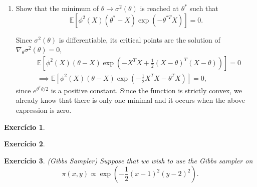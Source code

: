 \documentclass[a4paper,12pt]{article}
\newcommand{\ev}{\mathbb{E}}
\newtheorem{exercise}{Exercício}
\theoremstyle{definition}
\begin{document}
\begin{enumerate}
    \item Show that the minimum of $\theta \to \sigma^2(\theta)$ is 
    reached at $\theta^{*}$ such that
    $$
    \ev[\phi^2(X)(\theta^* - X)\exp(-\theta^{*T}X)] = 0.
    $$

    Since $\sigma^2(\theta)$ is differentiable, its critical points are 
    the solution of $\nabla_\theta \sigma^2(\theta) = 0$, 
    \begin{equation*}
        \begin{split}
            &\ev\left[\phi^2(X)(\theta-X)\exp\left(-X^TX +
        \frac{1}{2}(X-\theta)^T(X-\theta)\right)\right] = 0 \\
        &\implies \ev\left[\phi^2(X)(\theta-X)\exp\left(-\frac{1}{2}X^TX
        -\theta^TX\right)\right] = 0, 
        \end{split}
    \end{equation*}  
    since $e^{\theta^T\theta/2}$ is a positive constant. Since the function 
    is strictly convex, we already know that there is only one minimal 
    and it occurs when the above expression is zero. 
\end{enumerate}

\begin{exercise}
    
\end{exercise}

\begin{exercise}
    
\end{exercise}

\begin{exercise}
    (Gibbs Sampler) 
    Suppose that we wish to use the Gibbs sampler on
    $$
    \pi(x,y) \propto \exp\left(-\frac{1}{2}(x-1)^2(y-2)^2\right).
    $$
\end{exercise}
\end{document}
